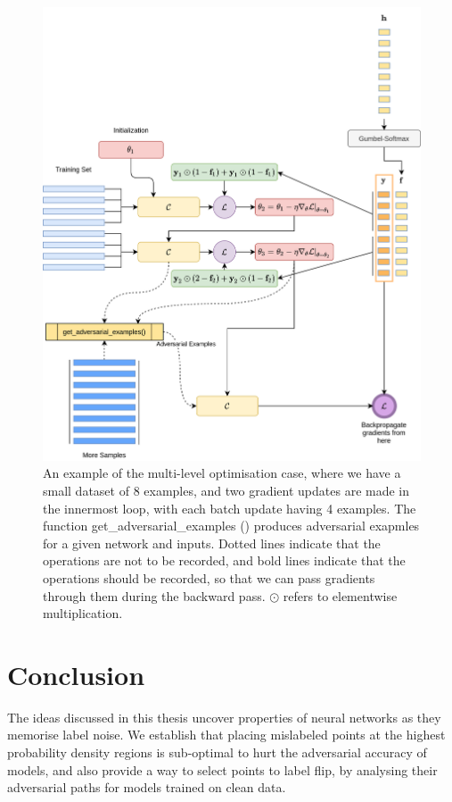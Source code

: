 \documentclass{ociamthesis}
\begin{document}
\begin{figure}
    \centering
    \includegraphics[scale=0.17]{biplot.png}
    \caption{An example of the multi-level optimisation case, where we have a
    small dataset of 8 examples, and two gradient updates are made in the
    innermost loop, with each batch update having 4 examples. The function
    get\_adversarial\_examples () produces adversarial exapmles for a given
    network and inputs. Dotted lines indicate that the operations are not to be
    recorded, and bold lines indicate that the operations should be recorded, so
    that we can pass gradients through them during the backward pass. $\odot$
    refers to elementwise multiplication.}
    \label{fig:bilevel-opt}
\end{figure}

\chapter{Conclusion}
The ideas discussed in this thesis uncover properties of neural networks as they
memorise label noise. We establish that placing mislabeled points at the highest
probability density regions is sub-optimal to hurt the adversarial accuracy of
models, and also provide a way to select points to label flip, by analysing
their adversarial paths for models trained on clean data.
\end{document}

